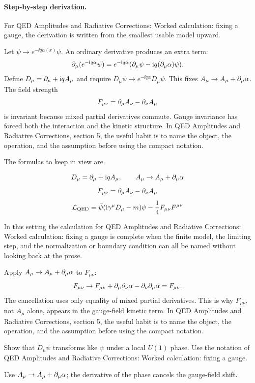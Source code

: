 \paragraph{Step-by-step derivation.}

For QED Amplitudes and Radiative Corrections: Worked calculation: fixing a gauge, the derivation is written from the smallest usable model upward.

Let \(\psi\to e^{-\ii q\alpha(x)}\psi\).  An ordinary derivative produces an extra term:
\[
  \partial_\mu(e^{-\mathrm i q\alpha}\psi)
  =
  e^{-\mathrm i q\alpha}(\partial_\mu\psi-\mathrm i q(\partial_\mu\alpha)\psi).
\]
Define \(D_\mu=\partial_\mu+\mathrm i qA_\mu\) and require \(D_\mu\psi\to e^{-\ii q\alpha}D_\mu\psi\).  This fixes \(A_\mu\to A_\mu+\partial_\mu\alpha\).  The field strength
\[
  F_{\mu\nu}=\partial_\mu A_\nu-\partial_\nu A_\mu
\]
is invariant because mixed partial derivatives commute.  Gauge invariance has forced both the interaction and the kinetic structure.  In QED Amplitudes and Radiative Corrections, section 5, the useful habit is to name the object, the operation, and the assumption before using the compact notation.

The formulas to keep in view are

\[
  D_\mu=\partial_\mu+\mathrm i qA_\mu,\qquad A_\mu\to A_\mu+\partial_\mu\alpha
\]
\[
  F_{\mu\nu}=\partial_\mu A_\nu-\partial_\nu A_\mu
\]
\[
  \mathcal L_{\mathrm{QED}}=\bar\psi(\mathrm i\gamma^\mu D_\mu-m)\psi-\frac14F_{\mu\nu}F^{\mu\nu}
\]

In this setting the calculation for QED Amplitudes and Radiative Corrections: Worked calculation: fixing a gauge is complete when the finite model, the limiting step, and the normalization or boundary condition can all be named without looking back at the prose.




\begin{example}
Apply \(A_\mu\to A_\mu+\partial_\mu\alpha\) to \(F_{\mu\nu}\):
\[
  F_{\mu\nu}\to F_{\mu\nu}+\partial_\mu\partial_\nu\alpha-\partial_\nu\partial_\mu\alpha=F_{\mu\nu}.
\]
The cancellation uses only equality of mixed partial derivatives.  This is why \(F_{\mu\nu}\), not \(A_\mu\) alone, appears in the gauge-field kinetic term.  In QED Amplitudes and Radiative Corrections, section 5, the useful habit is to name the object, the operation, and the assumption before using the compact notation.
\end{example}



\begin{exercise}
Show that \(D_\mu\psi\) transforms like \(\psi\) under a local \(U(1)\) phase.  Use the notation of QED Amplitudes and Radiative Corrections: Worked calculation: fixing a gauge.
\begin{answer}
Use \(A_\mu\to A_\mu+\partial_\mu\alpha\); the derivative of the phase cancels the gauge-field shift.
\end{answer}
\end{exercise}

